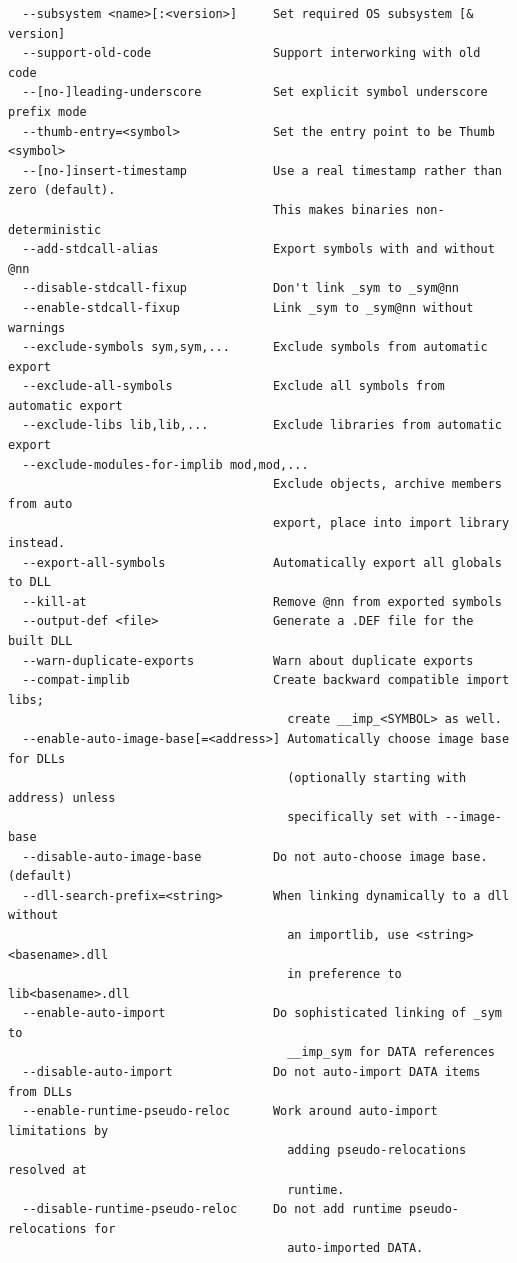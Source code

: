 \documentclass{article}
\begin{document}
\begin{lstlisting}
  --subsystem <name>[:<version>]     Set required OS subsystem [& version]
  --support-old-code                 Support interworking with old code
  --[no-]leading-underscore          Set explicit symbol underscore prefix mode
  --thumb-entry=<symbol>             Set the entry point to be Thumb <symbol>
  --[no-]insert-timestamp            Use a real timestamp rather than zero (default).
                                     This makes binaries non-deterministic
  --add-stdcall-alias                Export symbols with and without @nn
  --disable-stdcall-fixup            Don't link _sym to _sym@nn
  --enable-stdcall-fixup             Link _sym to _sym@nn without warnings
  --exclude-symbols sym,sym,...      Exclude symbols from automatic export
  --exclude-all-symbols              Exclude all symbols from automatic export
  --exclude-libs lib,lib,...         Exclude libraries from automatic export
  --exclude-modules-for-implib mod,mod,...
                                     Exclude objects, archive members from auto
                                     export, place into import library instead.
  --export-all-symbols               Automatically export all globals to DLL
  --kill-at                          Remove @nn from exported symbols
  --output-def <file>                Generate a .DEF file for the built DLL
  --warn-duplicate-exports           Warn about duplicate exports
  --compat-implib                    Create backward compatible import libs;
                                       create __imp_<SYMBOL> as well.
  --enable-auto-image-base[=<address>] Automatically choose image base for DLLs
                                       (optionally starting with address) unless
                                       specifically set with --image-base
  --disable-auto-image-base          Do not auto-choose image base. (default)
  --dll-search-prefix=<string>       When linking dynamically to a dll without
                                       an importlib, use <string><basename>.dll
                                       in preference to lib<basename>.dll
  --enable-auto-import               Do sophisticated linking of _sym to
                                       __imp_sym for DATA references
  --disable-auto-import              Do not auto-import DATA items from DLLs
  --enable-runtime-pseudo-reloc      Work around auto-import limitations by
                                       adding pseudo-relocations resolved at
                                       runtime.
  --disable-runtime-pseudo-reloc     Do not add runtime pseudo-relocations for
                                       auto-imported DATA.

\end{lstlisting}
\end{document}
